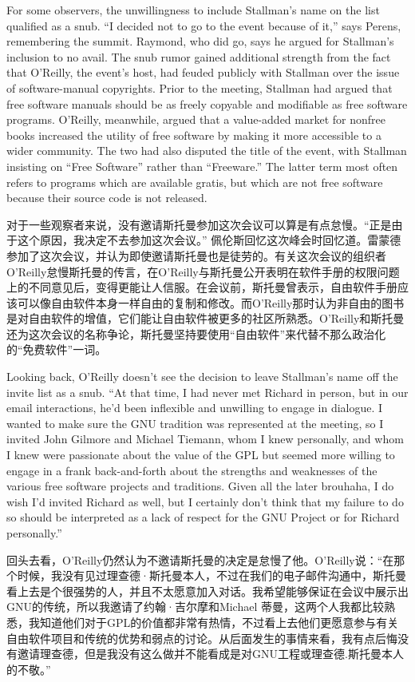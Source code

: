 \ifdefined\eng
For some observers, the unwillingness to include Stallman's name on the list qualified as a snub. ``I decided not to go to the event because of it,'' says Perens, remembering the summit. Raymond, who did go, says he argued for Stallman's inclusion to no avail. The snub rumor gained additional strength from the fact that O'Reilly, the event's host, had feuded publicly with Stallman over the issue of software-manual copyrights. Prior to the meeting, Stallman had argued that free software manuals should be as freely copyable and modifiable as free software programs. O'Reilly, meanwhile, argued that a value-added market for nonfree books increased the utility of free software by making it more accessible to a wider community. The two had also disputed the title of the event, with Stallman insisting on ``Free Software'' rather than ``Freeware.''  The latter term most often refers to programs which are available gratis, but which are not free software because their source code is not released.
\fi

\ifdefined\chs
对于一些观察者来说，没有邀请斯托曼参加这次会议可以算是有点怠慢。``正是由于这个原因，我决定不去参加这次会议。'' 佩伦斯回忆这次峰会时回忆道。雷蒙德参加了这次会议，并认为即使邀请斯托曼也是徒劳的。有关这次会议的组织者O'Reilly怠慢斯托曼的传言，在O'Reilly与斯托曼公开表明在软件手册的权限问题上的不同意见后，变得更能让人信服。在会议前，斯托曼曾表示，自由软件手册应该可以像自由软件本身一样自由的复制和修改。而O'Reilly那时认为非自由的图书是对自由软件的增值，它们能让自由软件被更多的社区所熟悉。O'Reilly和斯托曼还为这次会议的名称争论，斯托曼坚持要使用``自由软件''来代替不那么政治化的``免费软件''一词。
\fi

\ifdefined\eng
Looking back, O'Reilly doesn't see the decision to leave Stallman's name off the invite list as a snub. ``At that time, I had never met Richard in person, but in our email interactions, he'd been inflexible and unwilling to engage in dialogue. I wanted to make sure the GNU tradition was represented at the meeting, so I invited John Gilmore and Michael Tiemann, whom I knew personally, and whom I knew were passionate about the value of the GPL but seemed more willing to engage in a frank back-and-forth about the strengths and weaknesses of the various free software projects and traditions. Given all the later brouhaha, I do wish I'd invited Richard as well, but I certainly don't think that my failure to do so should be interpreted as a lack of respect for the GNU Project or for Richard personally.''
\fi

\ifdefined\chs
回头去看，O'Reilly仍然认为不邀请斯托曼的决定是怠慢了他。O'Reilly说：``在那个时候，我没有见过理查德·斯托曼本人，不过在我们的电子邮件沟通中，斯托曼看上去是个很强势的人，并且不太愿意加入对话。我希望能够保证在会议中展示出GNU的传统，所以我邀请了约翰·吉尔摩和Michael 蒂曼，这两个人我都比较熟悉，我知道他们对于GPL的价值都非常有热情，不过看上去他们更愿意参与有关自由软件项目和传统的优势和弱点的讨论。从后面发生的事情来看，我有点后悔没有邀请理查德，但是我没有这么做并不能看成是对GNU工程或理查德.斯托曼本人的不敬。''
\fi

